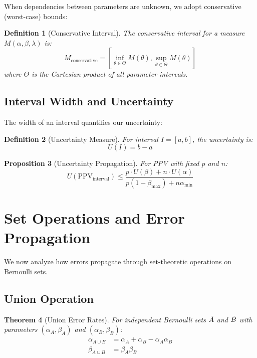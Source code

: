 \documentclass[11pt]{article}
\newcommand{\PPV}{\text{PPV}} %
\newcommand{\Interval}[2]{[#1, #2]} %
\newtheorem{theorem}{Theorem}[section]
\newtheorem{proposition}[theorem]{Proposition}
\newtheorem{definition}[theorem]{Definition}
\begin{document}
When dependencies between parameters are unknown, we adopt conservative (worst-case) bounds:

\begin{definition}[Conservative Interval]
The conservative interval for a measure $M(\alpha, \beta, \lambda)$ is:
\[
M_{\text{conservative}} = \Interval{\inf_{\theta \in \Theta} M(\theta)}{\sup_{\theta \in \Theta} M(\theta)}
\]
where $\Theta$ is the Cartesian product of all parameter intervals.
\end{definition}

\subsection{Interval Width and Uncertainty}

The width of an interval quantifies our uncertainty:

\begin{definition}[Uncertainty Measure]
For interval $I = \Interval{a}{b}$, the uncertainty is:
\[
U(I) = b - a
\]
\end{definition}

\begin{proposition}[Uncertainty Propagation]
For PPV with fixed $p$ and $n$:
\[
U(\PPV_{\text{interval}}) \leq \frac{p \cdot U(\beta) + n \cdot U(\alpha)}{p(1-\beta_{\max}) + n\alpha_{\min}}
\]
\end{proposition}

\section{Set Operations and Error Propagation}
\label{sec:operations}

We now analyze how errors propagate through set-theoretic operations on Bernoulli sets.

\subsection{Union Operation}

\begin{theorem}[Union Error Rates]
For independent Bernoulli sets $\tilde{A}$ and $\tilde{B}$ with parameters $(\alpha_A, \beta_A)$ and $(\alpha_B, \beta_B)$:
\begin{align}
\alpha_{A \cup B} &= \alpha_A + \alpha_B - \alpha_A \alpha_B \\
\beta_{A \cup B} &= \beta_A \beta_B
\end{align}
\end{theorem}
\end{document}
